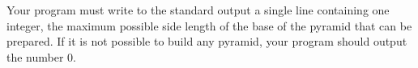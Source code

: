 Your program must write to the standard output a single line containing one integer, the maximum
possible side length of the base of the pyramid that can be prepared. If it is not possible to build any
pyramid, your program should output the number $0$.